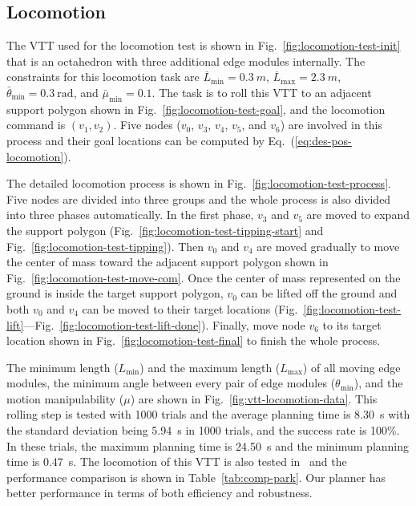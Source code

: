 \documentclass[journal]{IEEEtran}
\begin{document}
\subsection{Locomotion}
\label{sec:locomotion-test}

The VTT used for the locomotion test is shown in
Fig.~\ref{fig:locomotion-test-init} that is an octahedron with three
additional edge modules internally. The constraints for this
locomotion task are $\overline{L}_{\min} = \SI{0.3}{m}$,
$\overline{L}_{\max}=\SI{2.3}{m}$,
$\bar{\theta}_{\min}=\SI{0.3}{\radian}$, and
$\bar{\mu}_{\min}=0.1$. The task is to roll this VTT to an adjacent
support polygon shown in Fig.~\ref{fig:locomotion-test-goal}, and the
locomotion command is $(v_1, v_2)$. Five nodes ($v_0$, $v_3$, $v_4$,
$v_5$, and $v_6$) are involved in this process and their goal
locations can be computed by Eq.~(\ref{eq:des-pos-locomotion}).

The detailed locomotion process is shown in
Fig.~\ref{fig:locomotion-test-process}. Five nodes are divided into
three groups and the whole process is also divided into three phases
automatically. In the first phase, $v_3$ and $v_5$ are moved to expand
the support polygon (Fig.~\ref{fig:locomotion-test-tipping-start} and
Fig.~\ref{fig:locomotion-test-tipping}). Then $v_0$ and $v_4$ are
moved gradually to move the center of mass toward the adjacent support
polygon shown in Fig.~\ref{fig:locomotion-test-move-com}. Once the
center of mass represented on the ground is inside the target support
polygon, $v_0$ can be lifted off the ground and both $v_0$ and $v_4$
can be moved to their target locations
(Fig.~\ref{fig:locomotion-test-lift}---Fig.~\ref{fig:locomotion-test-lift-done}). Finally,
move node $v_6$ to its target location shown in
Fig.~\ref{fig:locomotion-test-final} to finish the whole process.

The minimum length ($L_{\min}$) and the maximum length ($L_{\max}$) of
all moving edge modules, the minimum angle between every pair of edge
modules ($\theta_{\min}$), and the motion manipulability ($\mu$) are
shown in Fig.~\ref{fig:vtt-locomotion-data}. This rolling step is
tested with 1000 trials and the average planning time is \SI{8.30}{s}
with the standard deviation being \SI{5.94}{s} in 1000 trials, and the
success rate is 100\%. In these trials, the maximum planning time is
\SI{24.50}{s} and the minimum planning time is \SI{0.47}{s}. The
locomotion of this VTT is also tested
in~\cite{Park-vtt-locomotion-ral-2020} and the performance comparison
is shown in Table~\ref{tab:comp-park}. Our planner has better
performance in terms of both efficiency and robustness.
\end{document}
